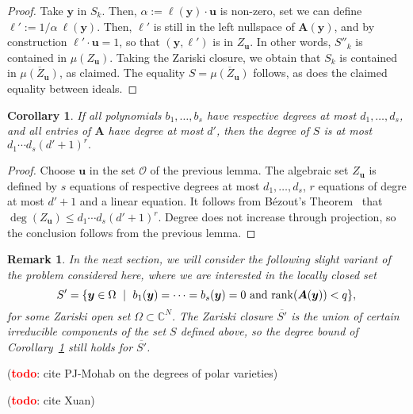 \documentclass[12pt]{article}
\def\X{S}
\def\yb{{\bm y}}
\def\C{\mathbb{C}}
\newcommand\todo[1]{(\textcolor{red}{{\bf todo}}: #1)}
\newtheorem{corollary}[theorem]{Corollary}
\newtheorem{remark}[theorem]{Remark}
\begin{document}
\begin{proof}
  Take $\bm y$ in $\X_k$. Then, $\alpha:=\bm \ell(\bm y)\cdot \bm u$
  is non-zero, set we can define $\bm \ell' := 1/\alpha\ \bm\ell(\bm y)$.
  Then, $\bm \ell'$ is still in the left nullspace of $\bm A(\bm y)$,
  and by construction $ \bm \ell'\cdot \bm u =1$, so that $(\bm y, \bm
  \ell')$ is in $Z_{\bm u}$. In other words, $\X''_k$ is contained in
  $\mu(Z_{\bm u})$. Taking the Zariski closure, we obtain that $\X_k$ 
  is contained in $\overline{\mu(Z_{\bm u})}$, as claimed. 
  The equality $\X = \overline{\mu(Z_{\bm u})}$ follows, as does the
  claimed equality between ideals.
\end{proof}

\begin{corollary} \label{coro:degree}
  If all polynomials $b_1,\dots,b_s$ have respective degrees at most
  $d_1,\dots,d_s$, and all entries of $\bm A$ have degree at most
  $d'$, then the degree of $\X$ is at most $d_1 \cdots d_s (d'+1)^r.$
\end{corollary}
\begin{proof}
  Choose $\bm u$ in the set $\mathscr{O}$ of the previous lemma.  The
  algebraic set $Z_{\bm u}$ is defined by $s$ equations of respective
  degrees at most $d_1,\dots,d_s$, $r$ equations of degre at most
  $d'+1$ and a linear equation. It follows from B\'ezout's
  Theorem~\cite{H} that $\deg(Z_{\bm u}) \leq d_1 \cdots d_s
  (d'+1)^r$. Degree does not increase through projection, so the
  conclusion follows from the previous lemma.
\end{proof}

\begin{remark}\label{rk:degree}
  In the next section, we will consider the following slight variant
  of the problem considered here, where we are interested in the
  locally closed set
  \[\X' = \{\yb \in \Omega \ \mid \ b_1(\yb) = \cdots = b_s(\yb) =0 
  \text{~and~} {\rm rank}(\bm A(\yb)) < q\},\] for some Zariski open
  set $\Omega \subset \C^N$.  The Zariski closure $\overline{\X'}$ is
  the union of certain irreducible components of the set $\X$ defined
  above, so the degree bound of Corollary~\ref{coro:degree} still
  holds for $\overline{\X'}$.
\end{remark}

\todo{cite PJ-Mohab on the degrees of polar varieties}

\todo{cite Xuan}

\end{document}
